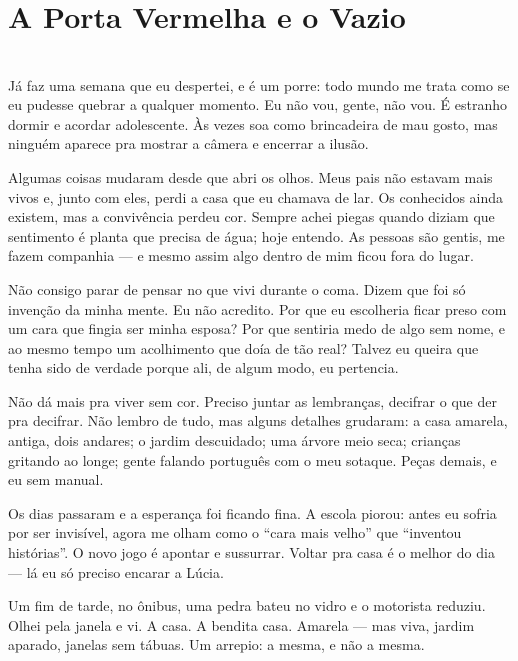 \newpage

\ifdefined\useChapters
\chapter{A Porta Vermelha e o Vazio}
\else
\chapter{}
\fi

Já faz uma semana que eu despertei, e é um porre: todo mundo me trata como se eu pudesse quebrar a qualquer momento. Eu não vou, gente, não vou. É estranho dormir e acordar adolescente. Às vezes soa como brincadeira de mau gosto, mas ninguém aparece pra mostrar a câmera e encerrar a ilusão.

Algumas coisas mudaram desde que abri os olhos. Meus pais não estavam mais vivos e, junto com eles, perdi a casa que eu chamava de lar. Os conhecidos ainda existem, mas a convivência perdeu cor. Sempre achei piegas quando diziam que sentimento é planta que precisa de água; hoje entendo. As pessoas são gentis, me fazem companhia — e mesmo assim algo dentro de mim ficou fora do lugar.

Não consigo parar de pensar no que vivi durante o coma. Dizem que foi só invenção da minha mente. Eu não acredito. Por que eu escolheria ficar preso com um cara que fingia ser minha esposa? Por que sentiria medo de algo sem nome, e ao mesmo tempo um acolhimento que doía de tão real? Talvez eu queira que tenha sido de verdade porque ali, de algum modo, eu pertencia.

Não dá mais pra viver sem cor. Preciso juntar as lembranças, decifrar o que der pra decifrar. Não lembro de tudo, mas alguns detalhes grudaram: a casa amarela, antiga, dois andares; o jardim descuidado; uma árvore meio seca; crianças gritando ao longe; gente falando português com o meu sotaque. Peças demais, e eu sem manual.

Os dias passaram e a esperança foi ficando fina. A escola piorou: antes eu sofria por ser invisível, agora me olham como o “cara mais velho” que “inventou histórias”. O novo jogo é apontar e sussurrar. Voltar pra casa é o melhor do dia — lá eu só preciso encarar a Lúcia.

Um fim de tarde, no ônibus, uma pedra bateu no vidro e o motorista reduziu. Olhei pela janela e vi. A casa. A bendita casa. Amarela — mas viva, jardim aparado, janelas sem tábuas. Um arrepio: a mesma, e não a mesma.
 
